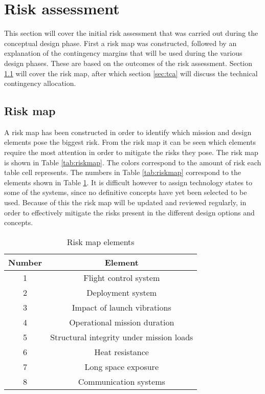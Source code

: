 \section{Risk assessment} 
\label{ch:risk}
This section will cover the initial risk assessment that was carried out during the conceptual design phase. First a risk map was constructed, followed by an explanation of the contingency margins that will be used during the various design phases. These are based on the outcomes of the risk assessment. Section \ref{sec:riskmap} will cover the risk map, after which section \ref{sec:tca} will discuss the technical contingency allocation.

\subsection{Risk map}
\label{sec:riskmap}
 A risk map has been constructed in order to identify which mission and design elements pose the biggest risk. From the risk map it can be seen which elements require the most attention in order to mitigate the risks they pose. The risk map is shown in Table \ref{tab:riskmap}. The colors correspond to the amount of risk each table cell represents. The numbers in Table \ref{tab:riskmap} correspond to the elements shown in Table \ref{tab:riskelements}. It is difficult however to assign technology states to some of the systems, since no definitive concepts have yet been selected to be used. Because of this the risk map will be updated and reviewed regularly, in order to effectively mitigate the risks present in the different design options and concepts.

\begin{table}[h]
	\centering
	\caption{Risk map elements}
	\label{tab:riskelements}
	\begin{tabular}{|c|c|}
		\hline
		\textbf{Number} & \textbf{Element} \\
		\hline
		1 & Flight control system\\
		2 & Deployment system\\
		3 & Impact of launch vibrations\\
		4 & Operational mission duration\\
		5 & Structural integrity under mission loads\\
		6 & Heat resistance\\
		7 & Long space exposure\\
		8 & Communication systems\\
		\hline
	\end{tabular}
\end{table}

